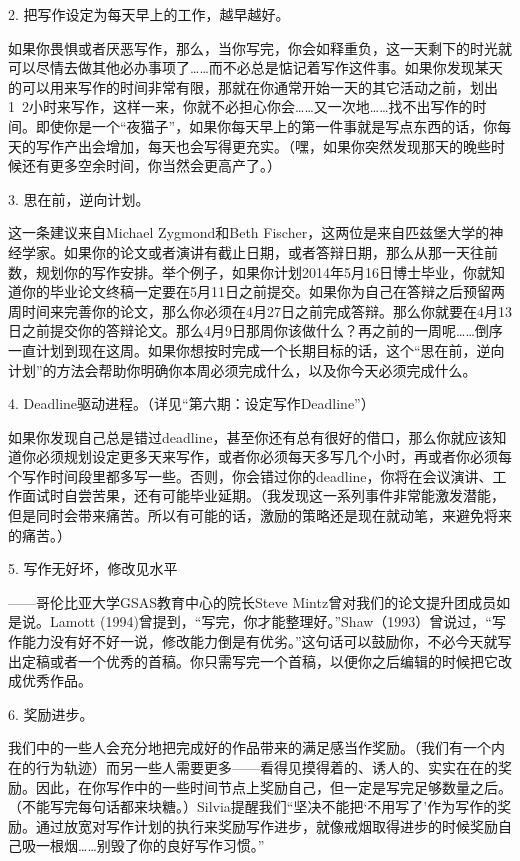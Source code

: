 \documentclass{ctexart}
\begin{document}
2. 把写作设定为每天早上的工作，越早越好。

如果你畏惧或者厌恶写作，那么，当你写完，你会如释重负，这一天剩下的时光就可以尽情去做其他必办事项了……而不必总是惦记着写作这件事。如果你发现某天的可以用来写作的时间非常有限，那就在你通常开始一天的其它活动之前，划出1~2小时来写作，这样一来，你就不必担心你会……又一次地……找不出写作的时间。即使你是一个“夜猫子”，如果你每天早上的第一件事就是写点东西的话，你每天的写作产出会增加，每天也会写得更充实。（嘿，如果你突然发现那天的晚些时候还有更多空余时间，你当然会更高产了。）

3. 思在前，逆向计划。

这一条建议来自Michael Zygmond和Beth Fischer，这两位是来自匹兹堡大学的神经学家。如果你的论文或者演讲有截止日期，或者答辩日期，那么从那一天往前数，规划你的写作安排。举个例子，如果你计划2014年5月16日博士毕业，你就知道你的毕业论文终稿一定要在5月11日之前提交。如果你为自己在答辩之后预留两周时间来完善你的论文，那么你必须在4月27日之前完成答辩。那么你就要在4月13日之前提交你的答辩论文。那么4月9日那周你该做什么？再之前的一周呢……倒序一直计划到现在这周。如果你想按时完成一个长期目标的话，这个“思在前，逆向计划”的方法会帮助你明确你本周必须完成什么，以及你今天必须完成什么。

4. Deadline驱动进程。（详见“第六期：设定写作Deadline”）

如果你发现自己总是错过deadline，甚至你还有总有很好的借口，那么你就应该知道你必须规划设定更多天来写作，或者你必须每天多写几个小时，再或者你必须每个写作时间段里都多写一些。否则，你会错过你的deadline，你将在会议演讲、工作面试时自尝苦果，还有可能毕业延期。（我发现这一系列事件非常能激发潜能，但是同时会带来痛苦。所以有可能的话，激励的策略还是现在就动笔，来避免将来的痛苦。）

5. 写作无好坏，修改见水平

——哥伦比亚大学GSAS教育中心的院长Steve Mintz曾对我们的论文提升团成员如是说。Lamott (1994)曾提到，“写完，你才能整理好。”Shaw（1993）曾说过，“写作能力没有好不好一说，修改能力倒是有优劣。”这句话可以鼓励你，不必今天就写出定稿或者一个优秀的首稿。你只需写完一个首稿，以便你之后编辑的时候把它改成优秀作品。

6. 奖励进步。

我们中的一些人会充分地把完成好的作品带来的满足感当作奖励。（我们有一个内在的行为轨迹）而另一些人需要更多——看得见摸得着的、诱人的、实实在在的奖励。因此，在你写作中的一些时间节点上奖励自己，但一定是写完足够数量之后。（不能写完每句话都来块糖。）Silvia提醒我们“坚决不能把‘不用写了’作为写作的奖励。通过放宽对写作计划的执行来奖励写作进步，就像戒烟取得进步的时候奖励自己吸一根烟……别毁了你的良好写作习惯。”
\end{document}
